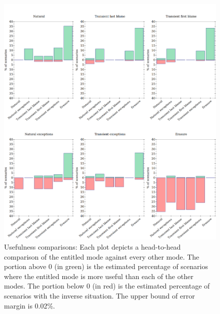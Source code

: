 \begin{figure}
  \centering
  \includegraphics[width=\textwidth]{./plots/avo-bars}
  \caption{Usefulness comparisons: Each plot depicts a head-to-head comparison of the entitled mode against every other mode.
  The portion above 0 (in green) is the estimated percentage of scenarios where the entitled mode is more useful than each of the other modes.
  The portion below 0 (in red) is the estimated percentage of scenarios with the inverse situation.
  The upper bound of error margin is 0.02\%.
  }
  \label{fig:avo-bars}
\end{figure}

